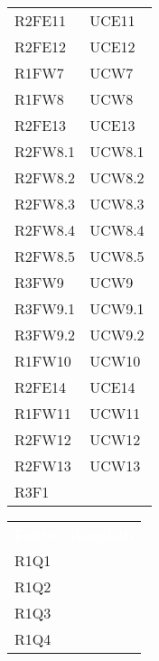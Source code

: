 \begin{table}[!htbp]
\begin{tabular}{ m{}<{\centering}  m{}<{\centering} }
	R2FE11 & UCE11\\
	 
	R2FE12 & UCE12\\			
	 
	R1FW7 & UCW7\\	
	 
	R1FW8 & UCW8\\		
	
	R2FE13 & UCE13\\	
	 
	R2FW8.1 & UCW8.1\\	
	 
	R2FW8.2 & UCW8.2\\	
	 
	R2FW8.3 & UCW8.3\\	
	 
	R2FW8.4 & UCW8.4\\	 
	 
	R2FW8.5 & UCW8.5\\	 
	 
	R3FW9 & UCW9\\	
	 
	R3FW9.1 & UCW9.1\\	 
	 
	R3FW9.2 & UCW9.2\\	  
	 
	R1FW10 & UCW10 \\	 
	 
	R2FE14 & UCE14\\	 
	 	 
	R1FW11 & UCW11\\	 	 	 	

	R2FW12 & UCW12\\

	R2FW13 & UCW13\\

	R3F1 & \Di \\

\end{tabular}
\begin{tabular}{ m{}<{\centering}  m{}<{\centering} }
	\rowcolor{darkblue}
	\textcolor{white}{\textbf{Fonte}} &\textcolor{white}{\textbf{Requisiti}}\\ 

	R1Q1 & \Di \\
	
	R1Q2 & \Ca \\
	
	R1Q3 & \Ca \\

	R1Q4 &  \Ca \\


\end{tabular}
\end{table}
